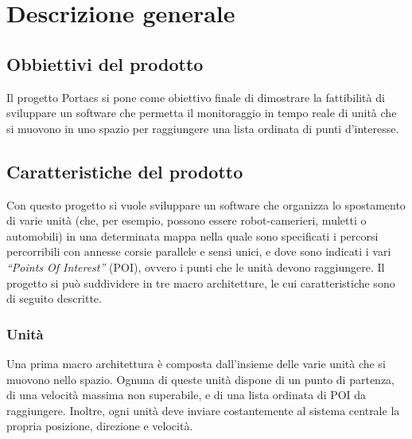 \section{Descrizione generale}

\subsection{Obbiettivi del prodotto}
Il progetto Portacs si pone come obiettivo finale di dimostrare la fattibilità di sviluppare un software che permetta il monitoraggio in tempo reale di unità che si muovono in uno spazio per raggiungere una lista ordinata di punti d’interesse.

\subsection{Caratteristiche del prodotto}
Con questo progetto si vuole sviluppare un software che organizza lo spostamento di varie unità (che, per esempio, possono essere robot-camerieri, muletti o automobili) in una determinata mappa nella quale sono specificati i percorsi percorribili con annesse corsie parallele e sensi unici, e dove sono indicati i vari \textit{“Points Of Interest”} (POI), ovvero i punti che le unità devono raggiungere. 
Il progetto si può suddividere in tre macro architetture, le cui caratteristiche sono di seguito descritte.
\subsubsection{Unità}
Una prima macro architettura è composta dall’insieme delle varie unità che si muovono nello spazio. Ognuna di queste unità dispone di un punto di partenza, di una velocità massima non superabile, e di una lista ordinata di POI da raggiungere.
Inoltre, ogni unità deve inviare costantemente al sistema centrale la propria posizione, direzione e velocità.

